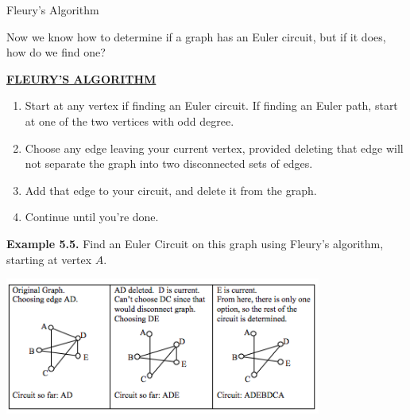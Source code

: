 \documentclass[aspectratio=169]{beamer}
\begin{document}
 \begin{frame}[plain]{Fleury’s Algorithm}
 
  Now we know how to determine if a graph has an Euler circuit, but if it does, how do we find one?
  \medskip
  
  \underline{\bf FLEURY'S ALGORITHM}
  \begin{enumerate}
    \item Start at any vertex if finding an Euler circuit. If finding an Euler path, start at one of the two vertices with odd degree.
    \item Choose any edge leaving your current vertex, provided deleting that edge will not separate the graph 
      into two disconnected sets of edges.
   \item Add that edge to your circuit, and delete it from the graph.
   \item Continue until you’re done.
 \end{enumerate}
 
 
 \end{frame}
 
 \begin{frame}[plain]{}
 
 
  {\bf Example 5.5.} Find an Euler Circuit on this graph using Fleury's algorithm, starting at vertex $A$.
     \begin{center}
        \includegraphics[height=4.5cm]{./img/lecture5-fig6.png}
      \end{center} 

\end{frame}
\end{document}
